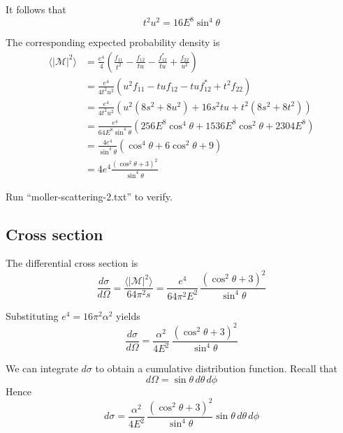 \documentclass[12pt]{article}
\begin{document}
\noindent
It follows that
\begin{equation*}
t^2u^2=16E^8\sin^4\theta
\end{equation*}

\noindent
The corresponding expected probability density is
\begin{align*}
\langle|\mathcal{M}|^2\rangle
&=\frac{e^4}{4}
\left(
\frac{f_{11}}{t^2}-\frac{f_{12}}{tu}-\frac{f_{12}^*}{tu}+\frac{f_{22}}{u^2}
\right)
\\
&=\frac{e^4}{4t^2u^2}
\left(
u^2f_{11}-tuf_{12}-tuf_{12}^*+t^2f_{22}
\right)
\\
&=\frac{e^4}{4t^2u^2}
\left(
u^2\left(8s^2+8u^2\right)+16s^2tu+t^2\left(8s^2+8t^2\right)
\right)
\\
&=\frac{e^4}{64E^8\sin^4\theta}
\left(256 E^8\cos^4\theta+1536 E^8\cos^2\theta+2304 E^8\right)
\\
&=\frac{4e^4}{\sin^4\theta}
\left(\cos^4\theta+6\cos^2\theta+9\right)
\\
&=4e^4\frac{\left(\cos^2\theta+3\right)^2}{\sin^4\theta}
\end{align*}

\noindent
Run ``moller-scattering-2.txt'' to verify.

\subsection*{Cross section}
The differential cross section is
\begin{equation*}
\frac{d\sigma}{d\Omega}
=\frac{\langle|\mathcal{M}|^2\rangle}{64\pi^2s}
=\frac{e^4}{64\pi^2E^2}\,\frac{\left(\cos^2\theta+3\right)^2}{\sin^4\theta}
\end{equation*}

\noindent
Substituting $e^4=16\pi^2\alpha^2$ yields
\begin{equation*}
\frac{d\sigma}{d\Omega}=\frac{\alpha^2}{4E^2}\,\frac{\left(\cos^2\theta+3\right)^2}{\sin^4\theta}
\end{equation*}

\noindent
We can integrate $d\sigma$ to obtain a cumulative distribution function.
Recall that
\begin{equation*}
d\Omega=\sin\theta\,d\theta\,d\phi
\end{equation*}
Hence
\begin{equation*}
d\sigma=\frac{\alpha^2}{4E^2}\,\frac{\left(\cos^2\theta+3\right)^2}{\sin^4\theta}\sin\theta\,d\theta\,d\phi
\end{equation*}
\end{document}
